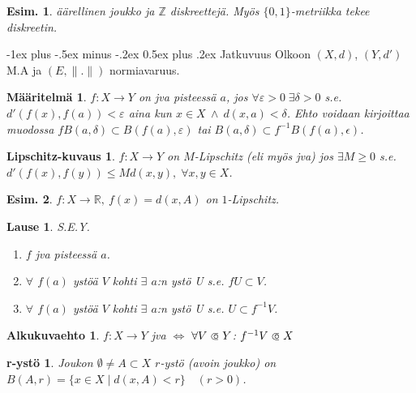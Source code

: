 \documentclass[landscape,a4paper,10pt]{article}
\makeatletter
\renewcommand{\section}{\@startsection{section}{1}{0mm}%
                                {-1ex plus -.5ex minus -.2ex}%
                                {0.5ex plus .2ex}%
                                {\color{blue}\normalfont\large\bfseries}}
\newcommand\opn{\mathrel{\ooalign{$\subset$\cr
  \hidewidth\hbox{$\circ\mkern.5mu$}\cr}}}
\theoremstyle{customtheoremstyle}
\newtheorem*{theorem}{Lause}
\newtheorem*{definition}{Määritelmä}
\newtheorem*{example}{Esim.}
\makeatother
\begin{document}
\begin{multicols*}{3}
\begin{example}
  äärellinen joukko ja $\mathbb{Z}$ diskreettejä. Myös $\{0,1\}$-metriikka
  tekee diskreetin.
\end{example}

\section{Jatkuvuus}
Olkoon $(X,d)$, $(Y,d')$ M.A ja $(E,\|.\|)$ normiavaruus.

\begin{definition}
  $f: X \rightarrow Y$ on jva pisteessä $a$, jos $\forall \varepsilon > 0 \;
  \exists \delta > 0$ s.e. $d'(f(x),f(a)) < \varepsilon$ aina kun $x \in X \:
  \land \: d(x,a) < \delta$. Ehto voidaan kirjoittaa muodossa
  $f B(a,\delta) \subset B(f(a), \varepsilon)$ tai $B(a,\delta) \subset
  f^{-1} B(f(a),\epsilon)$.
\end{definition}

\newtheorem*{lipschitz}{Lipschitz-kuvaus}
\begin{lipschitz}
  $f: X \rightarrow Y$ on $M$-Lipschitz (eli myös jva) jos $\exists M \geq 0$ s.e.
  $d'(f(x),f(y)) \leq M d(x,y), \; \forall x,y \in X$.
\end{lipschitz}

\begin{example}
  $f: X \rightarrow \mathbb{R}, \: f(x) = d(x,A)$ on $1$-Lipschitz.
\end{example}

\begin{theorem}
  S.E.Y.
  \begin{enumerate}
    \item[(1)]{$f$ jva pisteessä $a$.}
    \item[(2)]{$\forall$ $f(a)$ ystöä $V$ kohti $\exists$ $a$:n ystö U s.e. $f
      U \subset V$.}
    \item[(3)]{$\forall$ $f(a)$ ystöä $V$ kohti $\exists$ $a$:n ystö U s.e. $U
      \subset f^{-1} V$.}
  \end{enumerate}
\end{theorem}

\newtheorem*{alkukuvaehto}{Alkukuvaehto}
\begin{alkukuvaehto}
  $f: X \rightarrow Y$ jva $\iff$ $\forall V \opn Y$: $f^{-1} V \opn X$
\end{alkukuvaehto}

\newtheorem*{rystö}{r-ystö}
\begin{rystö}
  Joukon $\emptyset \neq A \subset X$ $r$-ystö (avoin joukko) on
  $B(A,r) = \{x \in X \; | \; d(x,A) < r\} \quad (r>0)$.
\end{rystö}


\end{multicols*}
\end{document}
